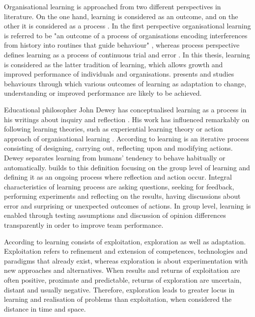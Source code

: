 Organisational learning is approached from two different perspectives in literature. On the one hand, learning is considered as an outcome, and on the other it is considered as a process \citep{edmondson1999psychological}. In the first perspective organisational learning is referred to be "an outcome of a process of organisations encoding interferences from history into routines that guide behaviour" \citep{levitt1988organizational}, whereas process perspective defines learning as a process of continuous trial and error \citep{argyris1978organizational}. In this thesis, learning is considered as the latter tradition of learning, which allows growth and improved performance of individuals and organisations. \citet{edmondson1999psychological} presents and studies behaviours through which various outcomes of learning as adaptation to change, understanding or improved performance are likely to be achieved. 

Educational philosopher John Dewey has conceptualised learning as a process in his writings about inquiry and reflection \citep{dewey1956human}. His work has influenced remarkably on following learning theories, such as experiential learning theory \citep{kolb1984experiential} or action approach of organisational learning \citep{schon1983reflective}. According to \citet{dewey1956human} learning is an iterative process consisting of designing, carrying out, reflecting upon and modifying actions. Dewey separates learning from humans' tendency to behave habitually or automatically. \citet{edmondson1999psychological} builds to this definition focusing on the group level of learning and defining it as an ongoing process where reflection and action occur. Integral characteristics of learning process are asking questions, seeking for feedback, performing experiments and reflecting on the results, having discussions about error and surprising or unexpected outcomes of actions. In group level, learning is enabled through testing assumptions and discussion of opinion differences transparently in order to improve team performance. \citep{edmondson1999psychological} 

According to \citet{march1991exploration} learning consists of exploitation, exploration as well as adaptation. Exploitation refers to refinement and extension of competences, technologies and paradigms that already exist, whereas exploration is about experimentation with new approaches and alternatives. When results and returns of exploitation are often positive, proximate and predictable, returns of exploration are uncertain, distant and usually negative. Therefore, exploration leads to greater locus in learning and realisation of problems than exploitation, when considered the distance in time and space. \citep{march1991exploration}

